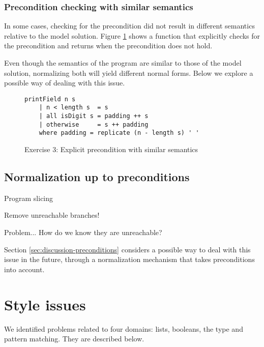 \subsubsection{Precondition checking with similar semantics}

In some cases, checking for the precondition did not result in different semantics relative to the model solution. Figure \ref{fig:analysis-precondition-similar-semantics} shows a function that explicitly checks for the precondition and returns  when the precondition does not hold.

Even though the semantics of the program are similar to those of the model solution, normalizing both will yield different normal forms. Below we explore a possible way of dealing with this issue.

\begin{figure}
\centering
\begin{verbatim}
printField n s
    | n < length s  = s
    | all isDigit s = padding ++ s
    | otherwise     = s ++ padding
    where padding = replicate (n - length s) ' '
\end{verbatim}
\caption{Exercise 3: Explicit precondition with similar semantics}
\label{fig:analysis-precondition-similar-semantics}
\end{figure}

\subsection{Normalization up to preconditions}

Program slicing

Remove unreachable branches!

Problem... How do we know they are unreachable?

Section \ref{sec:discussion-preconditions} considers a possible way to deal with this issue in the future, through a normalization mechanism that takes preconditions into account.


\section{Style issues}

We identified problems related to four domains: lists, booleans, the  type and pattern matching. They are described below.

